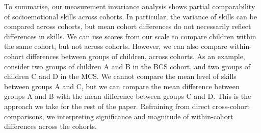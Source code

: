 To summarise, our measurement invariance analysis shows partial comparability of socioemotional skills across cohorts. In particular, the variance of skills can be compared across cohorts, but mean cohort differences do not necessarily reflect differences in skills. We can use scores from our scale to compare children within the same cohort, but not across cohorts. However, we can also compare within-cohort differences between groups of children, across cohorts. As an example, consider two groups of children A and B in the BCS cohort, and two groups of children C and D in the MCS. We cannot compare the mean level of skills between groups A and C, but we can compare the mean difference between groups A and B with the mean difference between groups C and D. This is the approach we take for the rest of the paper. Refraining from direct cross-cohort comparisons, we interpreting significance and magnitude of within-cohort differences across the cohorts.


